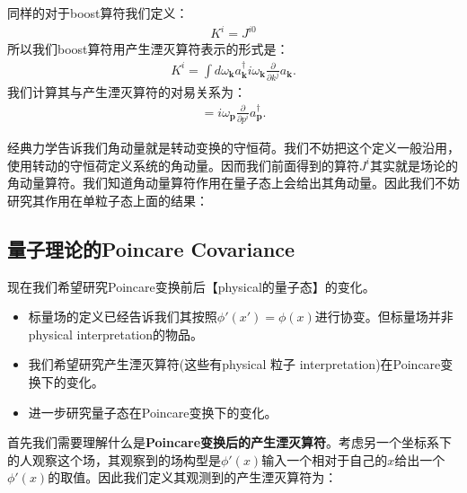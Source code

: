 \bigskip
{}

同样的对于boost算符我们定义：
\begin{align}
  K^i = J^{i0}
\end{align}
所以我们boost算符用产生湮灭算符表示的形式是：
\begin{align}
  K^i =\int
  d\omega_{\mathbf{k}}a_{\mathbf{k}}^{\dagger}i\omega_{\mathbf{k}}\frac{\partial}{\partial
  k^{j}}a_{\mathbf{k}}.
\end{align}
我们计算其与产生湮灭算符的对易关系为：
\begin{align}
  [K^i,a_{\mathbf{p}}^\dagger]=i\omega_{\mathbf{p}}\frac{\partial}{\partial
  p^i}a_{\mathbf{p}}^\dagger.
\end{align}

\bigskip
{}

经典力学告诉我们角动量就是转动变换的守恒荷。我们不妨把这个定义一般沿用，使用转动的守恒荷定义系统的角动量。因而我们前面得到的算符$ J^i
$其实就是场论的角动量算符。我们知道角动量算符作用在量子态上会给出其角动量。因此我们不妨研究其作用在单粒子态上面的结果：

\subsection{量子理论的Poincare Covariance}
现在我们希望研究Poincare变换前后【physical的量子态】的变化。
\begin{itemize}
  \item 标量场的定义已经告诉我们其按照$ \phi'(x') = \phi(x) $进行协变。但标量场并非physical
    interpretation的物品。
  \item 我们希望研究产生湮灭算符(这些有physical 粒子 interpretation)在Poincare变换下的变化。
  \item 进一步研究量子态在Poincare变换下的变化。
\end{itemize}
首先我们需要理解什么是\textbf{Poincare变换后的产生湮灭算符}。考虑另一个坐标系下的人观察这个场，其观察到的场构型是$
\phi'(x) $输入一个相对于自己的$ x $给出一个$ \phi'(x) $的取值。因此我们定义其观测到的产生湮灭算符为：

